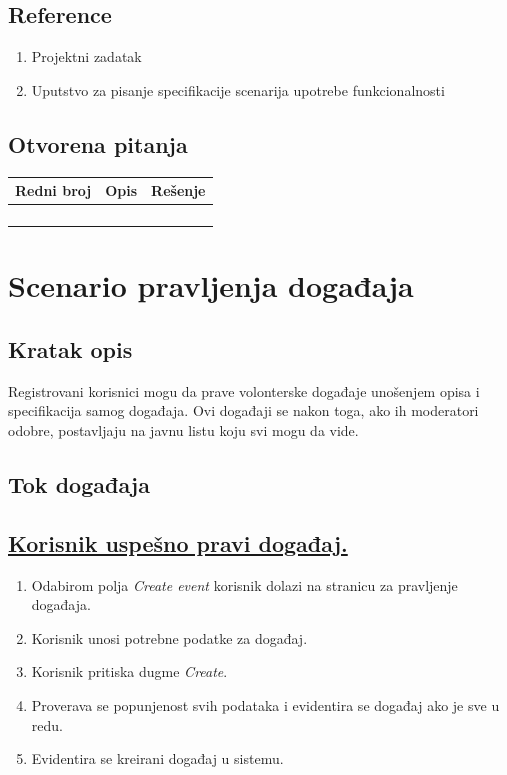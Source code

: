 \documentclass[11pt,a4paper]{article}
\begin{document}
\subsection{Reference}
\begin{enumerate}
    \item Projektni zadatak
    \item Uputstvo za pisanje specifikacije scenarija upotrebe funkcionalnosti
\end{enumerate}
\subsection{Otvorena pitanja}
\begin{center}
\begin{tabular}{| >{\centering\arraybackslash}m{1.9cm} | >{\centering\arraybackslash}m{4.9cm} | >{\centering\arraybackslash}m{4.9cm} |}
\hline
\rowcolor[HTML]{000000} 
{\color[HTML]{FFFFFF} Redni broj } & {\color[HTML]{FFFFFF} Opis } & {\color[HTML]{FFFFFF} Rešenje } \\ \hline
 &  & \\ \hline
 &  &  \\ \hline
 &  &  \\ \hline
 &  &  \\ \hline
\end{tabular}
\end{center}

\newpage

\section{Scenario pravljenja događaja}
\subsection{Kratak opis}
Registrovani korisnici mogu da prave volonterske događaje unošenjem opisa i specifikacija samog događaja. Ovi događaji se nakon toga, ako ih moderatori odobre, postavljaju na javnu listu koju svi mogu da vide.
\subsection{Tok događaja}
\subsection{\underline{Korisnik uspešno pravi događaj.}}
\begin{enumerate}
    \item Odabirom polja \textit{Create event} korisnik dolazi na stranicu za pravljenje događaja.
    \item Korisnik unosi potrebne podatke za događaj.
    \item Korisnik pritiska dugme \textit{Create}.
    \item Proverava se popunjenost svih podataka i evidentira se događaj ako je sve u redu.
    \item Evidentira se kreirani događaj u sistemu.
\end{enumerate}
\end{document}
